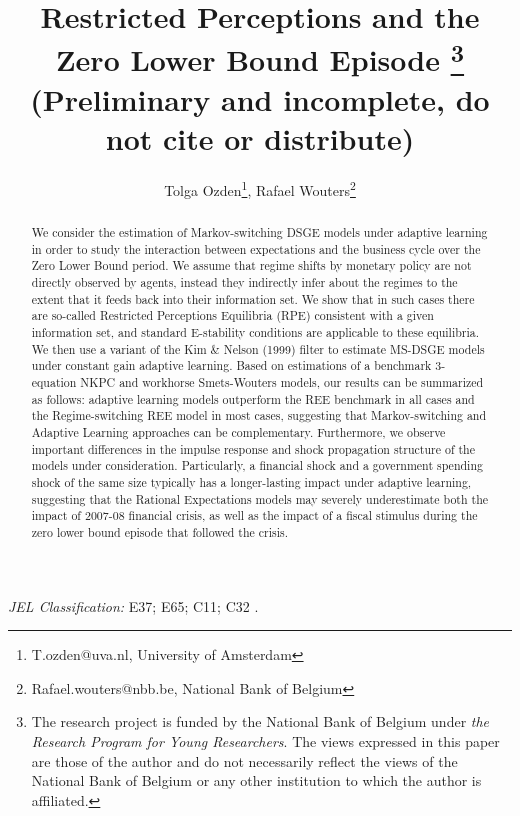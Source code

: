 \documentclass[12pt,reqno]{article}
\title{Restricted Perceptions and the Zero Lower Bound Episode \footnote{The research project is funded by the National Bank of Belgium under \textit{the Research Program for Young Researchers}. The views expressed in this paper are those of the author and do not necessarily reflect the views 
of the National Bank of Belgium or any other institution to which the author is affiliated.}\vspace{10 mm} \\ (Preliminary and incomplete, do not cite or distribute) }
\author{Tolga Ozden\footnote{T.ozden@uva.nl, University of Amsterdam}, Rafael Wouters\footnote{Rafael.wouters@nbb.be, National Bank of Belgium}}
\numberwithin{equation}{section}
\begin{document}
\maketitle



\begin{abstract}

We consider the estimation of Markov-switching DSGE models under adaptive learning in order to study the interaction between expectations and the business cycle over the Zero Lower Bound period. We assume that regime shifts by monetary policy are not directly observed by agents, instead they indirectly infer about the regimes to the extent that it feeds back into their information set.
 We show that in such cases there are so-called Restricted Perceptions Equilibria (RPE) consistent with a given information set, and standard E-stability conditions are applicable to these equilibria.
We then use a variant of the  Kim \& Nelson (1999) filter to estimate MS-DSGE models under constant gain adaptive learning. Based on estimations of a benchmark 3-equation NKPC and workhorse Smets-Wouters models, our results can be summarized as follows: adaptive learning models outperform the REE benchmark in all cases and the Regime-switching REE model in most cases, suggesting that Markov-switching and Adaptive Learning approaches can be complementary. Furthermore, we observe important differences in the impulse response and shock propagation structure of the models under consideration. Particularly, a financial shock and a government spending shock of the same size typically has a longer-lasting impact under adaptive learning, suggesting that the Rational Expectations models may severely underestimate both the impact of 2007-08 financial crisis, as well as the impact of a fiscal stimulus during the zero lower bound episode that followed the crisis.  




\end{abstract}

\vspace{3 mm}

\noindent
\textit{JEL Classification:} E37; E65; C11; C32 . \\


\vspace{3 mm}
\end{document}
